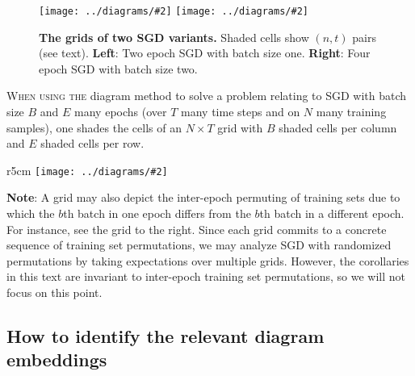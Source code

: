 \documentclass[anon,12pt]{colt2021} %
\newcommand{\dmoo}[2]{\texttt{[image: ../diagrams/\#2]}}
\begin{document}
        \begin{figure}[h!] 
            \centering
            \dmoo{3.55cm}{spacetime-b1-e2-nosh}
            \hfill
            \dmoo{3.55cm}{spacetime-b2-e4-nosh}
            \caption{
                \textbf{The grids of two SGD variants.}
                Shaded cells show $(n,t)$ pairs (see text).
                \textbf{Left}: Two epoch SGD with batch size one.
                \textbf{Right}: Four epoch SGD with batch size
                    two.  %
            }
            \label{fig:spacetimes}
        \end{figure}

        \noindent
        \colorbox{moolime}{\parbox{\textwidth}{
            \textsc{When using the} diagram method to solve a problem relating
            to SGD with batch size $B$ and $E$ many epochs (over $T$ many time
            steps and on $N$ many training samples), one shades the 
            cells of an $N\times T$ grid with $B$ shaded cells per column and
            $E$ shaded cells per row.
        }}
        \newline
        \par
        \begin{wrapfigure}{r}{5cm}
            \vspace{-0.5cm}
            \dmoo{3.00cm}{spacetime-b1-e2-shuf}
        \end{wrapfigure}
        \textbf{Note}:
        A grid may also depict the inter-epoch permuting of
        training sets due to which the $b$th batch in one epoch differs from
        the $b$th batch in a different epoch.  For instance, see the grid to
        the right.
        Since each grid commits to a concrete sequence of training set
        permutations, we may analyze SGD with randomized permutations by taking
        expectations over multiple grids.  However, the corollaries in this
        text are invariant to inter-epoch training set permutations, so we will
        not focus on this point.%

    \subsection{How to identify the relevant diagram embeddings}    \label{appendix:draw-embeddings}
\end{document}

